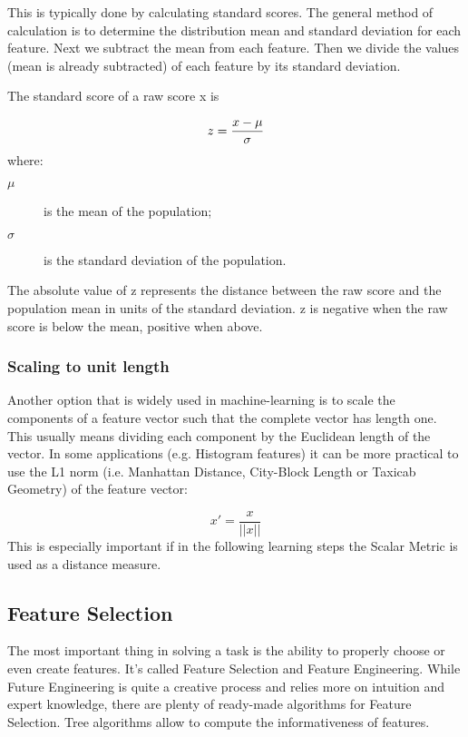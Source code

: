 \documentclass[a4paper,12pt]{article}
\begin{document}
This is typically done by calculating standard scores. The general method of calculation is to determine the distribution mean and standard deviation for each feature. Next we subtract the mean from each feature. Then we divide the values (mean is already subtracted) of each feature by its standard deviation.

The standard score of a raw score x is

\[z = {x- \mu \over \sigma}\]
where:

\begin{description}
\item[$\mu$] is the mean of the population;
\item[$\sigma$] is the standard deviation of the population.
\end{description}
The absolute value of z represents the distance between the raw score and the population mean in units of the standard deviation. z is negative when the raw score is below the mean, positive when above.

\subsubsection{Scaling to unit length}
Another option that is widely used in machine-learning is to scale the components of a feature vector such that the complete vector has length one. This usually means dividing each component by the Euclidean length of the vector. In some applications (e.g. Histogram features) it can be more practical to use the L1 norm (i.e. Manhattan Distance, City-Block Length or Taxicab Geometry) of the feature vector:

\[ x' = \frac{x}{||x||} \]
This is especially important if in the following learning steps the Scalar Metric is used as a distance measure.
\newpage
\subsection{Feature Selection}

The most important thing in solving a task is the ability to properly choose or even create features. It’s called Feature Selection and Feature Engineering. While Future Engineering is quite a creative process and relies more on intuition and expert knowledge, there are plenty of ready-made algorithms for Feature Selection. Tree algorithms allow to compute the informativeness of features.
\end{document}
